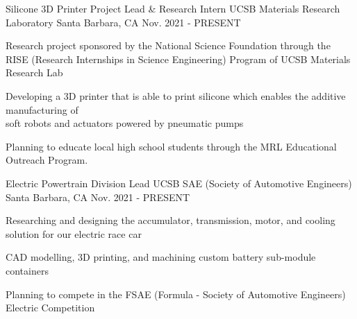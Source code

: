 

\begin{cventries}
\cventry
{Silicone 3D Printer Project Lead \& Research Intern} %
{UCSB Materials Research Laboratory} %
{Santa Barbara, CA} %
{Nov. 2021 - PRESENT} %
{ %
\begin{cvitems}
\item {Research project sponsored by the National Science Foundation through the \\ RISE (Research Internships in Science Engineering) Program of UCSB Materials Research Lab}
\item {Developing a 3D printer that is able to print silicone which enables the additive manufacturing of \\ soft robots and actuators powered by pneumatic pumps}
\item {Planning to educate local high school students through the MRL Educational Outreach Program.}
\end{cvitems}
}


\cventry
{Electric Powertrain Division Lead} %
{UCSB SAE (Society of Automotive Engineers)} %
{Santa Barbara, CA} %
{Nov. 2021 - PRESENT} %
{ %
\begin{cvitems}
\item {Researching and designing the accumulator, transmission, motor, and cooling solution for our electric race car}
\item {CAD modelling, 3D printing, and machining custom battery sub-module containers}
\item {Planning to compete in the FSAE (Formula - Society of Automotive Engineers) Electric Competition}
\end{cvitems}
}






\end{cventries}
